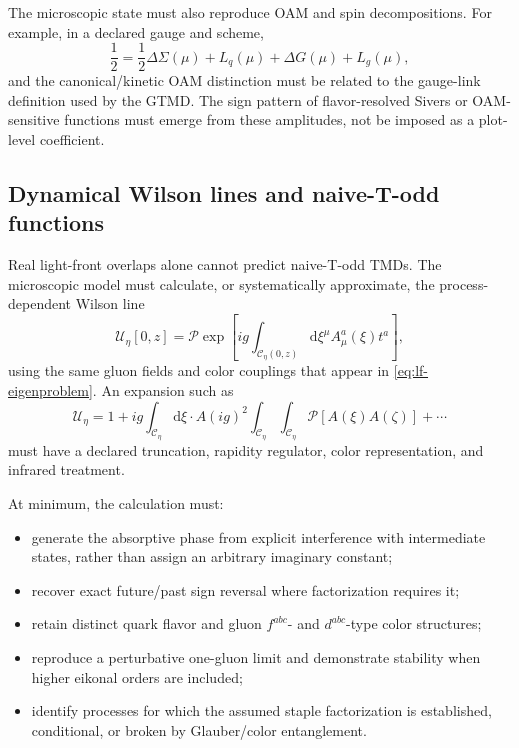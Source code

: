 \documentclass[11pt]{article}
\newcommand{\dd}{\mathrm{d}}
\begin{document}
The microscopic state must also reproduce OAM and spin decompositions.  For
example, in a declared gauge and scheme,
\begin{equation}
\frac12
=\frac12\Delta\Sigma(\mu)
+L_q(\mu)+\Delta G(\mu)+L_g(\mu),
\label{eq:spin-sum}
\end{equation}
and the canonical/kinetic OAM distinction must be related to the gauge-link
definition used by the GTMD.  The sign pattern of flavor-resolved Sivers or
OAM-sensitive functions must emerge from these amplitudes, not be imposed
as a plot-level coefficient.

\subsection{Dynamical Wilson lines and naive-T-odd functions}

Real light-front overlaps alone cannot predict naive-T-odd TMDs.  The
microscopic model must calculate, or systematically approximate, the
process-dependent Wilson line
\begin{equation}
\mathcal U_\eta[0,z]
=\mathcal P\exp\left[
ig\int_{\mathcal C_\eta(0,z)}
\dd\xi^\mu A_\mu^a(\xi)t^a
\right],
\label{eq:wilson-line}
\end{equation}
using the same gluon fields and color couplings that appear in
\cref{eq:lf-eigenproblem}.  An expansion such as
\begin{equation}
\mathcal U_\eta
=1+ig\int_{\mathcal C_\eta}\dd\xi\cdot A
(ig)^2\int_{\mathcal C_\eta}\!\!\int_{\mathcal C_\eta}
\mathcal P[A(\xi)A(\zeta)]+\cdots
\label{eq:wilson-expansion}
\end{equation}
must have a declared truncation, rapidity regulator, color representation,
and infrared treatment.

At minimum, the calculation must:
\begin{itemize}
  \item generate the absorptive phase from explicit interference with
  intermediate states, rather than assign an arbitrary imaginary constant;
  \item recover exact future/past sign reversal where factorization requires
  it;
  \item retain distinct quark flavor and gluon \(f^{abc}\)- and
  \(d^{abc}\)-type color structures;
  \item reproduce a perturbative one-gluon limit and demonstrate stability
  when higher eikonal orders are included;
  \item identify processes for which the assumed staple factorization is
  established, conditional, or broken by Glauber/color entanglement.
\end{itemize}
\end{document}
